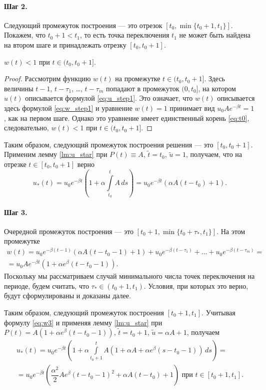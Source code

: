 \paragraph{Шаг 2.} Следующий промежуток построения --- это отрезок  $[t_0, \min\{t_0 + 1, t_1\}]$.
Покажем, что $t_0+1 < t_1$, то есть точка переключения $t_1$ не может быть найдена на втором шаге и принадлежать отрезку $[t_0, t_0 + 1]$.
\begin{lemma}
	\label{lm:u_step2}
	$w(t)<1$ при $t \in (t_0, t_0 + 1]$.
\end{lemma}
\begin{proof}
	Рассмотрим функцию $w(t)$ на промежутке $t \in (t_0,t_0+1]$. Здесь величины $t - 1$, $t - \tau_1$, \dots, $t - \tau_m$ попадают в промежуток $(0, t_0]$, на котором $u(t)$ описывается формулой \eqref{eq:u_step1}. Это означает, что $w(t)$ описывается здесь формулой \eqref{eq:w_step1} и уравнение $w(t) = 1$ принимает вид $u_0 A e^{-\beta t} = 1$, как на первом шаге. Однако это  уравнение имеет единственный корень \eqref{eq:t0}, следовательно, $w(t) < 1$ при $t \in (t_0, t_0 + 1]$.
\end{proof}

Таким образом, следующий промежуток построения решения --- это $[t_0,t_0+1]$. Применим лемму \eqref{lm:u_star} при $P(t)\equiv A$, $\tilde{t} = t_0$, $\tilde{u} = 1$, получаем, что на отрезке $t \in [t_0, t_0 + 1]$ верно
\begin{equation}
	\label{eq:u_step2}
	u_*(t)= u_0 e^{-\beta t}\left(1 + \alpha\int\limits_{t_0}^t A\,ds \right) = u_0 e^{-\beta t}(\alpha A(t-t_0) + 1).
\end{equation}

\paragraph{Шаг 3.} Очередной промежуток построения --- это $[t_0 + 1, \min\{t_0 + \tau_*, t_1\}]$. На этом промежутке
%
\begin{multline}
	\label{eq:w3}
	w(t)=u_0 e^{-\beta (t-1)}(\alpha A(t-t_0-1)+1)+u_0 e^{-\beta(t - \tau_1)} + \ldots + u_0 e^{-\beta(t-\tau_m)} = \\
	= u_0 A e^{-\beta t}(1 + \alpha e^{\beta}(t - t_0 - 1)).
\end{multline}
Поскольку мы рассматриваем случай минимального числа точек переключения на периоде, будем считать, что $\tau_* \in (t_0 + 1, t_1)$. Условия, при которых это верно, будут сформулированы и доказаны далее.

Таким образом, следующий промежуток построения $[t_0 + 1, t_1]$. Учитывая формулу \eqref{eq:w3} и применяя лемму \ref{lm:u_star} при $P(t) = A(1 + \alpha e^\beta(t - t_0 - 1))$, $\tilde{t} = t_0+1$, $\tilde{u}=\alpha A+1$, получаем
\begin{multline}
	\label{eq:u_step3}
	u_*(t) = u_0 e^{-\beta t}\left(1 + \alpha\int\limits_{t_0 + 1}^t A(1 + \alpha A + \alpha e^\beta(s - t_0 - 1)) \,ds \right) =\\= u_0 e^{-\beta t}\left(\dfrac{\alpha^2}{2}Ae^{\beta}(t-t_0-1)^2+\alpha A(t-t_0)+1\right)\text{ при }t\in[t_0+1,t_1].
\end{multline}


